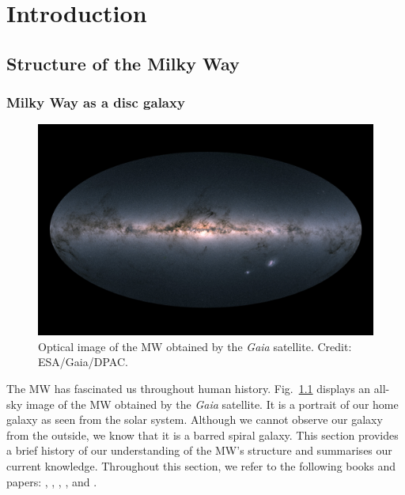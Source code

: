 \chapter{Introduction}\label{ch:introduction}
\section{Structure of the Milky Way}\label{sec:intro}
\subsection{Milky Way as a disc galaxy}
\begin{figure}[t]
	\begin{center}
		\includegraphics[width=0.8\linewidth]{figs/Gaia_s_sky_in_colour.pdf}
		\caption[Optical image of the MW obtained by the \textit{Gaia} satellite]{Optical image of the MW obtained by the \textit{Gaia} satellite. Credit: ESA/Gaia/DPAC.}\label{fig:gaia_sky}
	\end{center}
\end{figure}
The \ac{MW} has fascinated us throughout human history.
Fig.~\ref{fig:gaia_sky} displays an all-sky image of the \ac{MW} obtained by the \textit{Gaia} satellite. It is a portrait of our home galaxy as seen from the solar system.
Although we cannot observe our galaxy from the outside, we know that it is a barred spiral galaxy. This section provides a brief  history of our understanding of the \ac{MW}'s structure and summarises our current knowledge.
Throughout this section, we refer to the following books and papers: \citet{1998gaas.book.....B}, \citet{2008gady.book.....B}, \citet{2016ARA&A..54..529B}, \citet{2017gra..book.....S}, \citet{Ginga2} and \citet{vanderKruit2019}.

